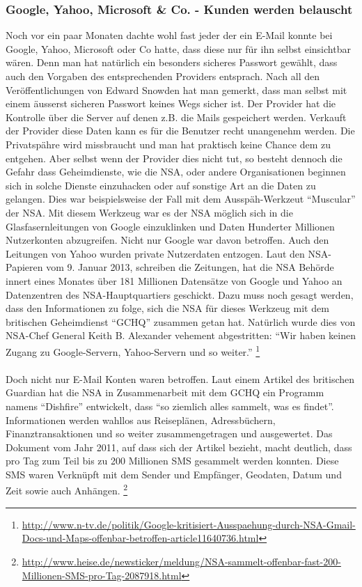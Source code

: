 \subsubsection{Google, Yahoo, Microsoft \& Co. - Kunden werden belauscht}
Noch vor ein paar Monaten dachte wohl fast jeder der ein E-Mail konnte bei Google, Yahoo, Microsoft oder Co hatte, dass diese nur für ihn selbst einsichtbar wären. Denn man hat natürlich ein besonders sicheres Passwort gewählt, dass auch den Vorgaben des entsprechenden Providers entsprach. Nach all den Veröffentlichungen von Edward Snowden hat man gemerkt, dass man selbst mit einem äusserst sicheren Passwort keines Wegs sicher ist. Der Provider hat die Kontrolle über die Server auf denen z.B. die Mails gespeichert werden. Verkauft der Provider diese Daten kann es für die Benutzer recht unangenehm werden. Die Privatspähre wird missbraucht und man hat praktisch keine Chance dem zu entgehen.
Aber selbst wenn der Provider dies nicht tut, so besteht dennoch die Gefahr dass Geheimdienste, wie die NSA, oder andere Organisationen beginnen sich in solche Dienste einzuhacken oder auf sonstige Art an die Daten zu gelangen.
Dies war beispielsweise der Fall mit dem Ausspäh-Werkzeut ``Muscular'' der NSA. Mit diesem Werkzeug war es der NSA möglich sich in die Glasfasernleitungen von Google einzuklinken und Daten Hunderter Millionen Nutzerkonten abzugreifen. Nicht nur Google war davon betroffen. Auch den Leitungen von Yahoo wurden private Nutzerdaten entzogen. Laut den NSA-Papieren vom 9. Januar 2013, schreiben die Zeitungen, hat die NSA Behörde innert eines Monates über 181 Millionen Datensätze von Google und Yahoo an Datenzentren des NSA-Hauptquartiers geschickt. Dazu muss noch gesagt werden, dass den Informationen zu folge, sich die NSA für dieses Werkzeug mit dem britischen Geheimdienst ``GCHQ'' zusammen getan hat.
Natürlich wurde dies von NSA-Chef General Keith B. Alexander vehement abgestritten: ``Wir haben keinen Zugang zu Google-Servern, Yahoo-Servern und so weiter.'' \footnote{\url{http://www.n-tv.de/politik/Google-kritisiert-Ausspaehung-durch-NSA-Gmail-Docs-und-Maps-offenbar-betroffen-article11640736.html}} \\ \\

Doch nicht nur E-Mail Konten waren betroffen. Laut einem Artikel des britischen Guardian hat die NSA in Zusammenarbeit mit dem GCHQ ein Programm namens ``Dishfire'' entwickelt, dass ``so ziemlich alles sammelt, was es findet''.
Informationen werden wahllos aus Reiseplänen, Adressbüchern, Finanztransaktionen und so weiter zusammengetragen und ausgewertet. Das Dokument vom Jahr 2011, auf dass sich der Artikel bezieht, macht deutlich, dass pro Tag zum Teil bis zu 200 Millionen SMS gesammelt werden konnten. Diese SMS waren Verknüpft mit dem Sender und Empfänger, Geodaten, Datum und Zeit sowie auch Anhängen.
\footnote{\url{http://www.heise.de/newsticker/meldung/NSA-sammelt-offenbar-fast-200-Millionen-SMS-pro-Tag-2087918.html}}

